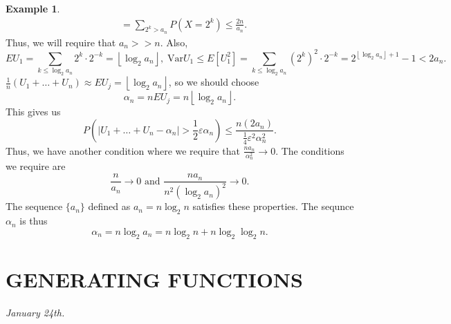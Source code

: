 \documentclass[15pt,a4paper]{book}
\theoremstyle{definition}
\newtheorem{example}[theorem]{Example}
\newcommand{\abs}[1]{\left| #1 \right|} %
\newcommand{\Var}{\text{Var}}
\newcommand{\floor}[1]{\left\lfloor #1 \right\rfloor} %
\begin{document}
\begin{example}
\begin{align}
        &= \sum_{2^{k}>a_{n}} P(X=2^{k}) \leq \frac{2n}{a_{n}}.
    \end{align}
    Thus, we will require that $a_{n} >> n$. Also,
    \begin{equation}
        EU_{1} = \sum_{k \leq \log_{2}a_{n}} 2^{k} \cdot 2^{-k} = \floor{\log_{2}a_{n}}, \; \Var{U_{1}} \leq E[U_{1}^{2}] = \sum_{k \leq \log_{2}a_{n}} (2^{k})^{2} \cdot 2^{-k} = 2^{\floor{\log_{2}a_{n}}+1}-1 < 2a_{n}.
    \end{equation}
    $\frac{1}{n}(U_{1}+\ldots+U_{n}) \approx EU_{j} = \floor{\log_{2}a_{n}}$, so we should choose
    \begin{equation}
        \alpha_{n} = n EU_{j} = n \floor{\log_{2}a_{n}}.
    \end{equation}
    This gives us
    \begin{equation}
        P(\abs{U_{1}+\ldots+U_{n}-\alpha_{n}} > \frac{1}{2}\varepsilon \alpha_{n}) \leq \frac{n(2a_{n})}{\frac{1}{4}\varepsilon^{2}\alpha_{n}^{2}}.
    \end{equation}
    Thus, we have another condition where we require that $\frac{na_{n}}{\alpha_{n}^{2}} \to 0$. The conditions we require are
    \begin{equation*}
        \frac{n}{a_{n}} \to 0 \text{ and } \frac{na_{n}}{n^{2}(\log_{2}a_{n})^{2}} \to 0.
    \end{equation*}
    The sequence $\{a_{n}\}$ defined as $a_{n} = n \log_{2} n$ satisfies these properties. The sequnce $\alpha_{n}$ is thus
    \begin{equation}
        \alpha_{n} = n \log_{2} a_{n} = n \log_{2} n + n \log_{2} \log_{2} n.
    \end{equation}
\end{example}

\chapter{GENERATING FUNCTIONS}

\textit{January 24th.}
\end{document}
